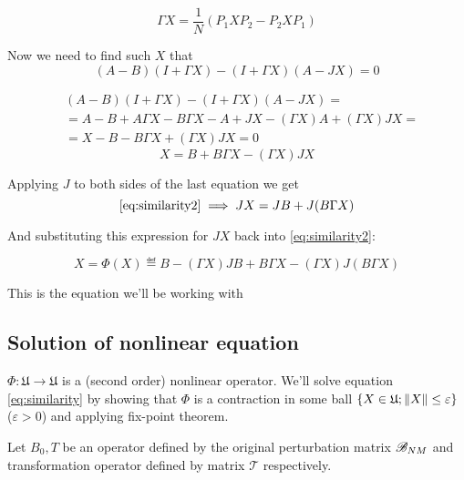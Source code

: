 \documentclass{article}
\begin{document}
$$\Gamma X = \frac{1}{N} (P_1 X P_2 - P_2 X P_1)$$

Now we need to find such $X$ that
\begin{equation}\label{eq:similarity1}
    (A - B)(I + \Gamma X) - (I + \Gamma X)(A - JX) = 0
\end{equation}

$$\begin{aligned}
    & (A - B)(I + \Gamma X) - (I + \Gamma X)(A - JX) = \\
    & = A - B + A\Gamma X - B\Gamma X - A + JX - (\Gamma X) A + (\Gamma X) JX = \\
    & = X - B - B\Gamma X + (\Gamma X) JX = 0
\end{aligned}$$
\begin{equation}\label{eq:similarity2}
    X = B + B\Gamma X - (\Gamma X) JX
\end{equation}

Applying $J$ to both sides of the last equation we get
$$\eqref{eq:similarity2} \implies
JX = JB + J(B\Gamma X)$$

And substituting this expression for $JX$ back into \eqref{eq:similarity2}:

\begin{equation}\label{eq:similarity}
    X = \Phi(X) \eqdef B - (\Gamma X) JB + B\Gamma X - (\Gamma X) J(B\Gamma X)
\end{equation}

This is the equation we'll be working with

\subsection{Solution of nonlinear equation}
$\Phi:\mathfrak U\to\mathfrak U$ is a (second order) nonlinear operator.
We'll solve equation \eqref{eq:similarity}
by showing that $\Phi$ is a contraction in some ball $\{ X\in \mathfrak U; \left\|{X}\right\| \leq \varepsilon \}$ ($\varepsilon>0$)
and applying fix-point theorem.

Let $B_0, T$ be an operator defined by the original perturbation matrix $\mathscr{B}_{{N}{M}}$
and transformation operator defined by matrix $\mathcal T$ respectively.
\end{document}

